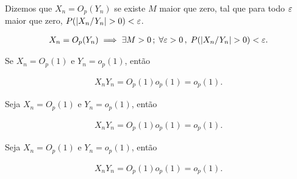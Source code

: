 \documentclass[11pt,oneside,a4paper]{article}
\numberwithin{equation}{section}
\begin{document}
\begin{def1}
Dizemos que
$X_{n} = O_{p}(Y_{n})$ se existe $M$ maior que zero, tal que para todo $\varepsilon$ maior que zero, $P( | X_{n}/Y_{n} | > 0) < \varepsilon$.

\vspace{-1 em}
\begin{align*}
X_{n} = O_{p}(Y_{n}) \implies \exists M > 0 \, ; \;
\forall \varepsilon > 0 \, , \;
P( | X_{n}/Y_{n} | > 0) < \varepsilon.
\end{align*}
\end{def1}

\begin{def1}
Se
$X_{n} = O_{p}(1)$ e $Y_{n} = o_{p}(1)$, então

\vspace{-1 em}
\begin{align*}
	X_{n} Y_{n} = O_{p}(1) o_{p}(1) = o_{p}(1).
\end{align*}
\end{def1}

\begin{def1}
Seja
$X_{n} = O_{p}(1)$ e $Y_{n} = o_{p}(1)$, então

\vspace{-1 em}
\begin{align*}
	X_{n} Y_{n} = O_{p}(1) o_{p}(1) = o_{p}(1).
\end{align*}
\end{def1}

\begin{def1}
Seja
$X_{n} = O_{p}(1)$ e $Y_{n} = o_{p}(1)$, então

\vspace{-1 em}
\begin{align*}
	X_{n} Y_{n} = O_{p}(1) o_{p}(1) = o_{p}(1).
\end{align*}
\end{def1}

\begin{def1}[]
\end{def1}
\end{document}
